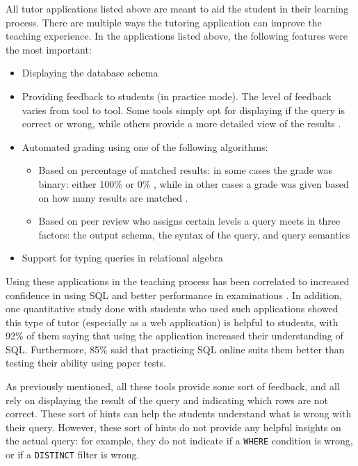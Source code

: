 All tutor applications listed above are meant to aid the student in their learning process. There are multiple ways the tutoring application can improve the teaching experience. In the applications listed above, the following features were the most important:

\begin{itemize}
    \item Displaying the database schema
    \item Providing feedback to students (in practice mode). The level of feedback varies from tool to tool. Some tools simply opt for displaying if the query is correct or wrong, while others provide a more detailed view of the results \citep{literature:assesql, literature:activesql}.
    \item Automated grading using one of the following algorithms:
        \begin{itemize}
            \item Based on percentage of matched results: in some cases the grade was binary: either 100\% or 0\% \citep{literature:assesql}, while in other cases a grade was given based on how many results are matched \citep{literature:activesql}.
            \item Based on peer review who assigns certain levels a query meets \citep{literature:sqlify} in three factors: the output schema, the syntax of the query, and query semantics
        \end{itemize}
    \item Support for typing queries in relational algebra
\end{itemize}

Using these applications in the teaching process has been correlated to increased confidence in using SQL \citep{literature:activesql} and better performance in examinations \citep{literature:sqlify}. In addition, one quantitative study done with students who used such applications \citep{literature:activesql} showed this type of tutor (especially as a web application) is helpful to students, with 92\% of them saying that using the application increased their understanding of SQL. Furthermore, 85\% said that practicing SQL online suits them better than testing their ability using paper tests.

As previously mentioned, all these tools provide some sort of feedback, and all rely on displaying the result of the query and indicating which rows are not correct. These sort of hints can help the students understand what is wrong with their query. However, these sort of hints do not provide any helpful insights on the actual query: for example, they do not indicate if a \texttt{WHERE} condition is wrong, or if a \texttt{DISTINCT} filter is wrong.

